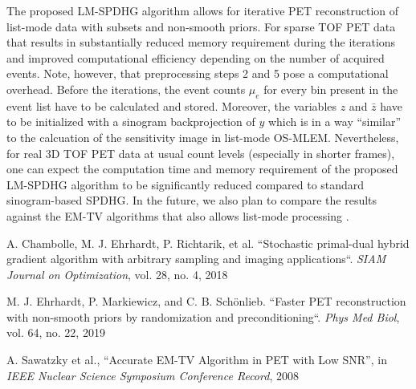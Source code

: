 \documentclass{IEEEtran}
\begin{document}
The proposed LM-SPDHG algorithm allows for  iterative PET reconstruction of list-mode
data with subsets and non-smooth priors.
For sparse TOF PET data that results in substantially reduced memory requirement during
the iterations and improved computational efficiency depending on the number of acquired
events.
Note, however, that preprocessing steps 2 and 5 pose a computational overhead. 
Before the iterations, the event counts $\mu_e$ for every bin present in the event list
have to be calculated and stored.
Moreover, the variables $z$ and $\bar{z}$ have to be initialized with a sinogram
backprojection of $y$ which is in a way ``similar'' to the calcuation of the sensitivity
image in list-mode OS-MLEM.
Nevertheless, for real 3D TOF PET data at usual count levels (especially in shorter frames), one can
expect the computation time and memory requirement of the proposed LM-SPDHG algorithm to be significantly reduced compared to standard sinogram-based SPDHG.
In the future, we also plan to compare the results against the EM-TV algorithms that also
allows list-mode processing \cite{Sawatzky2008}.


\begin{thebibliography}{00}
A. Chambolle, M. J. Ehrhardt, P. Richtarik, et al. 
``Stochastic primal-dual hybrid gradient algorithm with arbitrary sampling and imaging
applications``. 
\textit{SIAM Journal on Optimization}, vol. 28, no. 4, 2018

 M. J. Ehrhardt, P. Markiewicz, and C. B. Sch\"onlieb. 
``Faster PET reconstruction with non-smooth priors by randomization and preconditioning``. 
\textit{Phys Med Biol}, vol. 64, no. 22, 2019

 A. Sawatzky et al.,
``Accurate EM-TV Algorithm in PET with Low SNR'',
in \textit{IEEE Nuclear Science Symposium Conference Record}, 2008
\end{thebibliography}
\end{document}
